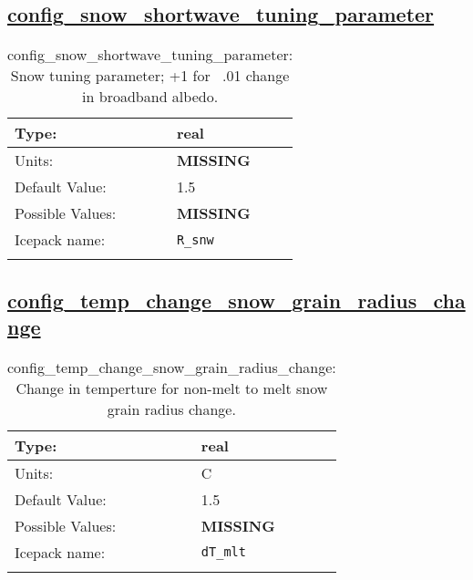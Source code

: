 \subsection[config\_snow\_shortwave\_tuning\_parameter]{\hyperref[sec:nm_tab_shortwave]{config\_snow\_shortwave\_tuning\_parameter}}
\label{subsec:nm_sec_config_snow_shortwave_tuning_parameter}
\begin{center}
\begin{longtable}{| p{2.0in} || p{4.0in} |}
    \hline
    Type: & real \\
    \hline
    Units: & {\bf \color{red} MISSING} \\
    \hline
    Default Value: & 1.5 \\
    \hline
    Possible Values: & {\bf \color{red} MISSING} \\
    \hline
    \hline
    Icepack name: & \verb+R_snw+ \\
    \caption{config\_snow\_shortwave\_tuning\_parameter: Snow tuning parameter; +1 for ~.01 change in broadband albedo.}
\end{longtable}
\end{center}
\subsection[config\_temp\_change\_snow\_grain\_radius\_change]{\hyperref[sec:nm_tab_shortwave]{config\_temp\_change\_snow\_grain\_radius\_change}}
\label{subsec:nm_sec_config_temp_change_snow_grain_radius_change}
\begin{center}
\begin{longtable}{| p{2.0in} || p{4.0in} |}
    \hline
    Type: & real \\
    \hline
    Units: & \si{C} \\
    \hline
    Default Value: & 1.5 \\
    \hline
    Possible Values: & {\bf \color{red} MISSING} \\
    \hline
    \hline
    Icepack name: & \verb+dT_mlt+ \\
    \caption{config\_temp\_change\_snow\_grain\_radius\_change: Change in temperture for non-melt to melt snow grain radius change.}
\end{longtable}
\end{center}

